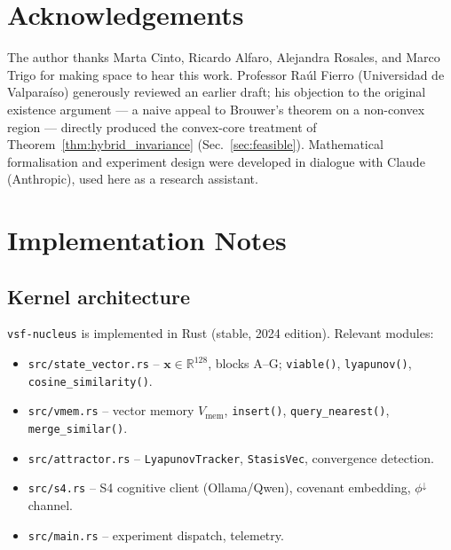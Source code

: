\documentclass[11pt, a4paper]{article}
\newcommand{\R}{\mathbb{R}}
\newcommand{\sv}{\bm{x}}
\newcommand{\nucleus}{\texttt{vsf-nucleus}}
\begin{document}
\section*{Acknowledgements}

The author thanks Marta Cinto, Ricardo Alfaro, Alejandra Rosales, and Marco Trigo
for making space to hear this work.
Professor Ra\'{u}l Fierro (Universidad de Valpara\'{i}so) generously reviewed
an earlier draft; his objection to the original existence argument --- a naive
appeal to Brouwer's theorem on a non-convex region --- directly produced the
convex-core treatment of Theorem~\ref{thm:hybrid_invariance}
(Sec.~\ref{sec:feasible}).
Mathematical formalisation and experiment design were developed in dialogue with
Claude (Anthropic), used here as a research assistant.






\appendix

\section{Implementation Notes}
\label{app:impl}

\subsection{Kernel architecture}

\nucleus{} is implemented in Rust (stable, 2024 edition).
Relevant modules:
\begin{itemize}
  \item \texttt{src/state\_vector.rs} -- $\sv \in \R^{128}$, blocks A--G;
        \texttt{viable()}, \texttt{lyapunov()},
        \texttt{cosine\_similarity()}.
  \item \texttt{src/vmem.rs} -- vector memory $V_\text{mem}$,
        \texttt{insert()}, \texttt{query\_nearest()}, \texttt{merge\_similar()}.
  \item \texttt{src/attractor.rs} -- \texttt{LyapunovTracker},
        \texttt{StasisVec}, convergence detection.
  \item \texttt{src/s4.rs} -- S4 cognitive client (Ollama/Qwen),
        covenant embedding, $\phi^\downarrow$ channel.
  \item \texttt{src/main.rs} -- experiment dispatch, telemetry.
\end{itemize}
\end{document}
